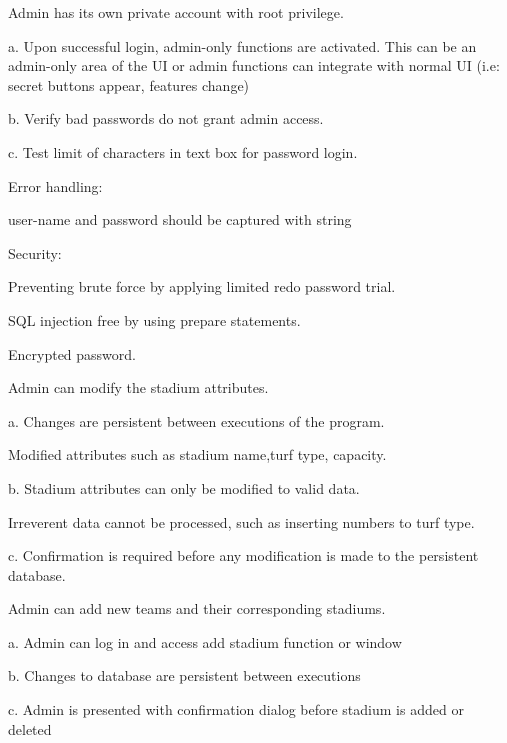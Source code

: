 \begin{DoxyEnumerate}
\item Admin has its own private account with root privilege.

a. Upon successful login, admin-\/only functions are activated. This can be an admin-\/only area of the UI or admin functions can integrate with normal UI (i.\+e\+: secret buttons appear, features change)

b. Verify bad passwords do not grant admin access.

c. Test limit of characters in text box for password login.
\begin{DoxyItemize}
\item Error handling\+:
\begin{DoxyItemize}
\item user-\/name and password should be captured with string
\end{DoxyItemize}
\item Security\+:
\begin{DoxyItemize}
\item Preventing brute force by applying limited redo password trial.
\item S\+QL injection free by using prepare statements.
\item Encrypted password.
\end{DoxyItemize}
\end{DoxyItemize}
\item Admin can modify the stadium attributes.

a. Changes are persistent between executions of the program. \begin{DoxyVerb}Modified attributes such as stadium name,turf type, capacity.
\end{DoxyVerb}


b. Stadium attributes can only be modified to valid data. \begin{DoxyVerb}Irreverent data cannot be processed, such as inserting numbers to turf type.
\end{DoxyVerb}


c. Confirmation is required before any modification is made to the persistent database.
\item Admin can add new teams and their corresponding stadiums.

a. Admin can log in and access add stadium function or window

b. Changes to database are persistent between executions

c. Admin is presented with confirmation dialog before stadium is added or deleted


\end{DoxyEnumerate}
